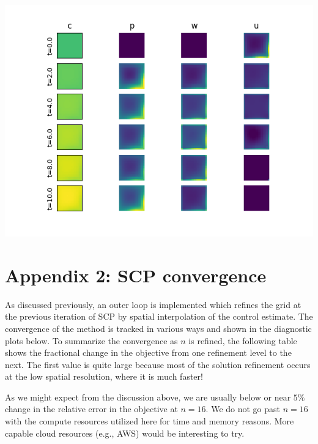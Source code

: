 \documentclass[11pt]{article}
\begin{document}
\begin{minipage}{\textwidth}
	\begin{center}
		\includegraphics[width=0.8\linewidth]{../resim_240718-012904/slices.png}
		\vspace{5pt}
		\label{fig: appspotfast}
	\end{center}
\end{minipage}

\section{Appendix 2: SCP convergence}

As discussed previously, an outer loop is implemented which refines the grid at the previous iteration of SCP by spatial interpolation of the control estimate. The convergence of the method is tracked in various ways and shown in the diagnostic plots below. To summarize the convergence as $n$ is refined, the following table shows the fractional change in the objective from one refinement level to the next. The first value is quite large because most of the solution refinement occurs at the low spatial resolution, where it is much faster!

As we might expect from the discussion above, we are usually below or near $5\%$ change in the relative error in the objective at $n=16$. We do not go past $n=16$ with the compute resources utilized here for time and memory reasons. More capable cloud resources (e.g., AWS) would be interesting to try.
\end{document}
